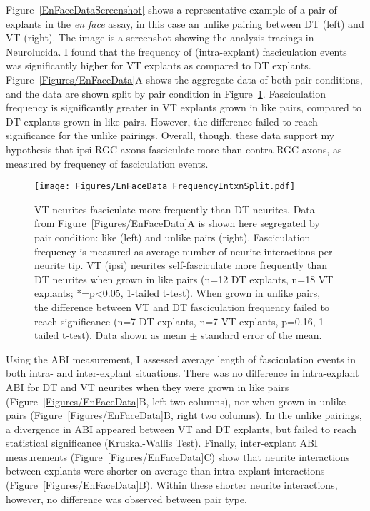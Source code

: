 Figure~\ref{EnFaceDataScreenshot} shows a representative example of a pair of explants in the \emph{en face} assay, in this case an unlike pairing between DT (left) and VT (right).
The image is a screenshot showing the analysis tracings in Neurolucida.
I found that the frequency of (intra-explant) fasciculation events was significantly higher for VT explants as compared to DT explants.
Figure~\ref{Figures/EnFaceData}A shows the aggregate data of both pair conditions, and the data are shown split by pair condition in Figure~\ref{Figures/EnFaceDataFrequencyIntxnSplit}.
Fasciculation frequency is significantly greater in VT explants grown in like pairs, compared to DT explants grown in like pairs.
However, the difference failed to reach significance for the unlike pairings.
Overall, though, these data support my hypothesis that ipsi RGC axons fasciculate more than contra RGC axons, as measured by frequency of fasciculation events.
\begin{figure}[hbtp]
    \begin{center}
        \texttt{[image: Figures/EnFaceData\_FrequencyIntxnSplit.pdf]}
        \caption[VT neurites fasciculate more frequently than DT neurites.]
        {
        VT neurites fasciculate more frequently than DT neurites.
        Data from Figure~\ref{Figures/EnFaceData}A is shown here segregated by pair condition: like (left) and unlike pairs (right).
        Fasciculation frequency is measured as average number of neurite interactions per neurite tip.
        VT (ipsi) neurites self-fasciculate more frequently than DT neurites when grown in like pairs (n=12 DT explants, n=18 VT explants; *=p<0.05, 1-tailed t-test).
        When grown in unlike pairs, the difference between VT and DT fasciculation frequency failed to reach significance (n=7 DT explants, n=7 VT explants, p=0.16, 1-tailed t-test).
        Data shown as mean $\pm$ standard error of the mean.
        }
        \label{Figures/EnFaceDataFrequencyIntxnSplit}
    \end{center}
\end{figure}

Using the ABI measurement, I assessed average length of fasciculation events in both intra- and inter-explant situations.
There was no difference in intra-explant ABI for DT and VT neurites when they were grown in like pairs (Figure~\ref{Figures/EnFaceData}B, left two columns), nor when grown in unlike pairs (Figure~\ref{Figures/EnFaceData}B, right two columns).
In the unlike pairings, a divergence in ABI appeared between VT and DT explants, but failed to reach statistical significance (Kruskal-Wallis Test).
Finally, inter-explant ABI measurements (Figure~\ref{Figures/EnFaceData}C) show that neurite interactions between explants were shorter on average than intra-explant interactions (Figure~\ref{Figures/EnFaceData}B).
Within these shorter neurite interactions, however, no difference was observed between pair type.

